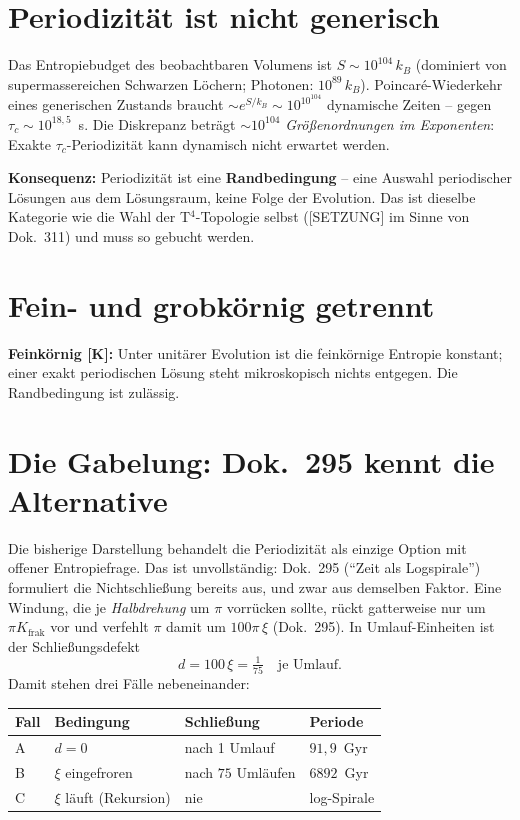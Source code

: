 \section{Periodizität ist nicht generisch}

Das Entropiebudget des beobachtbaren Volumens ist
$S \sim 10^{104}\,k_B$ (dominiert von supermassereichen Schwarzen
Löchern; Photonen: $10^{89}\,k_B$). Poincaré-Wiederkehr eines
generischen Zustands braucht $\sim e^{S/k_B} \sim 10^{10^{104}}$
dynamische Zeiten -- gegen $\tau_c \sim 10^{18{,}5}$~s. Die
Diskrepanz beträgt $\sim 10^{104}$ \emph{Größenordnungen im
Exponenten}: Exakte $\tau_c$-Periodizität kann dynamisch nicht
erwartet werden.

\textbf{Konsequenz:} Periodizität ist eine
\textbf{Randbedingung} -- eine Auswahl periodischer Lösungen aus
dem Lösungsraum, keine Folge der Evolution. Das ist dieselbe
Kategorie wie die Wahl der T$^4$-Topologie selbst ([SETZUNG] im
Sinne von Dok.~311) und muss so gebucht werden.

\section{Fein- und grobkörnig getrennt}

\textbf{Feinkörnig [K]:} Unter unitärer Evolution ist die
feinkörnige Entropie konstant; einer exakt periodischen Lösung
steht mikroskopisch nichts entgegen. Die Randbedingung ist
zulässig.

\section{Die Gabelung: Dok.~295 kennt die Alternative}

Die bisherige Darstellung behandelt die Periodizität als einzige
Option mit offener Entropiefrage. Das ist unvollständig: Dok.~295
(\enquote{Zeit als Logspirale}) formuliert die Nichtschließung
bereits aus, und zwar aus demselben Faktor. Eine Windung, die je
\emph{Halbdrehung} um $\pi$ vorrücken sollte, rückt gatterweise
nur um $\pi K_\text{frak}$ vor und verfehlt $\pi$ damit um
$100\pi\,\xi$ (Dok.~295). In Umlauf-Einheiten ist der
Schließungsdefekt
\begin{equation}
  d = 100\,\xi = \tfrac{1}{75}\quad\text{je Umlauf.}
\end{equation}
Damit stehen drei Fälle nebeneinander:

\begin{center}
\begin{tabular}{llll}
\toprule
Fall & Bedingung & Schließung & Periode \\
\midrule
A & $d = 0$ & nach 1 Umlauf & $91{,}9$~Gyr \\
B & $\xi$ eingefroren & nach $75$ Umläufen & $6892$~Gyr \\
C & $\xi$ läuft (Rekursion) & nie & log-Spirale \\
\bottomrule
\end{tabular}
\end{center}

